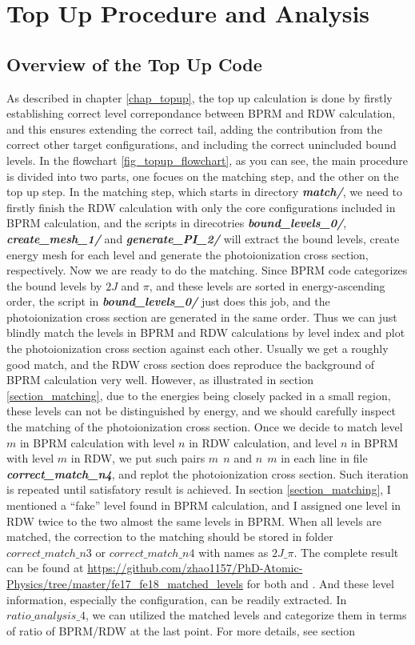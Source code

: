 \chapter{Top Up Procedure and Analysis} \label{app_topup_procedure_analy}

\section{Overview of the Top Up Code}
As described in chapter \ref{chap_topup}, the top up calculation is done by firstly establishing correct level correpondance between BPRM and RDW calculation, and this ensures extending the correct tail, adding the contribution from the correct other target configurations, and including the correct unincluded bound levels. In the flowchart \ref{fig_topup_flowchart}, as you can see, the main procedure is divided into two parts, one focues on the matching step, and the other on the top up step. In the matching step, which starts in directory \textbf{\textit{match/}}, we need to firstly finish the RDW calculation with only the core configurations included in BPRM calculation, and the scripts in direcotries \textbf{\textit{bound\_levels\_0/}}, \textbf{\textit{create\_mesh\_1/}} and \textbf{\textit{generate\_PI\_2/}} will extract the bound levels, create energy mesh for each level and generate the photoionization cross section, respectively. Now we are ready to do the matching. Since BPRM code categorizes the bound levels by $2J$ and $\pi$, and these levels are sorted in energy-ascending order, the script in \textbf{\textit{bound\_levels\_0/}} just does this job, and the photoionization cross section are generated in the same order. Thus we can just blindly match the levels in BPRM and RDW calculations by level index and plot the photoionization cross section against each other. Usually we get a roughly good match, and the RDW cross section does reproduce the background of BPRM calculation very well. However, as illustrated in section \ref{section_matching}, due to the energies being closely packed in a small region, these levels can not be distinguished by energy, and we should carefully inspect the matching of the photoionization cross section. Once we decide to match level $m$ in BPRM calculation with level $n$ in RDW calculation, and level $n$ in BPRM with level $m$ in RDW, we put such pairs $m~~n$ and $n~~m$ in each line in file \textbf{\textit{correct\_match\_n4}}, and replot the photoionization cross section. Such iteration is repeated until satisfatory result is achieved. In section \ref{section_matching}, I mentioned a ``fake'' level found in BPRM calculation, and I assigned one level in RDW twice to the two almost the same levels in BPRM. When all levels are matched, the correction to the matching should be stored in folder $correct\_match\_n3$ or $correct\_match\_n4$ with names as $2J\_\pi$. The complete result can be found at \url{https://github.com/zhao1157/PhD-Atomic-Physics/tree/master/fe17_fe18_matched_levels} for both  and . And these level information, especially the configuration, can be readily extracted. In $ratio\_analysis\_4$, we can utilized the matched levels and categorize them in terms of ratio of BPRM/RDW at the last point. For more details, see section 